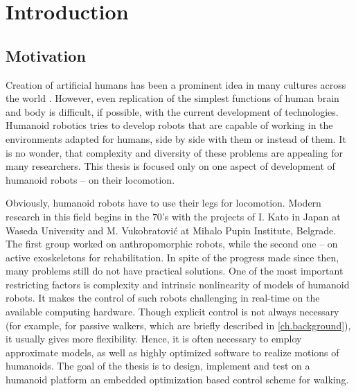 \chapter{Introduction}
\label{ch.introduction}

\section{Motivation}
Creation of artificial humans has been a prominent idea in many cultures across the
world \cite{KempHumanoids}. However, even replication of the simplest functions of human
brain and body is difficult, if possible, with the current development of technologies.
Humanoid robotics tries to develop robots that are capable of working in the 
environments adapted for humans, side by side with them or instead of them.
It is no wonder, that complexity and diversity of these problems are appealing for 
many researchers. This thesis is focused only on one aspect of development of humanoid 
robots -- on their locomotion.

Obviously, humanoid robots have to use their legs for locomotion. Modern research in 
this field begins in the $70$'s with the projects of I. Kato in Japan at Waseda University 
and M. Vukobratovi\'c at Mihalo Pupin Institute, Belgrade. The first group worked on 
anthropomorphic robots, while the second one -- on active exoskeletons for rehabilitation.
In spite of the progress made since then, many problems still do not have practical 
solutions. One of the most important restricting factors is complexity and intrinsic
nonlinearity of models of humanoid robots. It makes the control of such robots challenging
in real-time on the available computing hardware. Though explicit control is not always
necessary (for example, for passive walkers, which are briefly described in \cref{ch.background}),
it usually gives more flexibility. Hence, it is often necessary to employ approximate models, 
as well as highly optimized software to realize motions of humanoids. The goal of the
thesis is to design, implement and test on a humanoid platform an embedded optimization 
based control scheme for walking.


